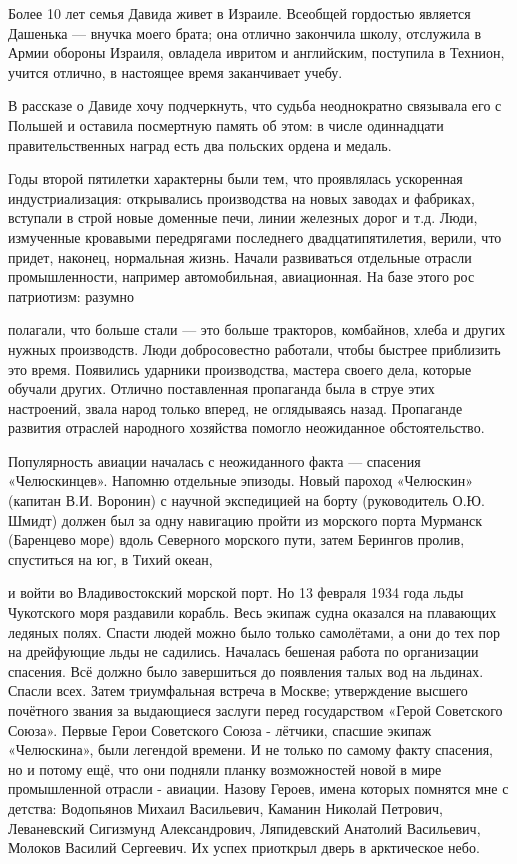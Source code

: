 \label{172-1}
Более 10 лет семья Давида живет в Израиле. Всеобщей гордостью является Дашенька — внучка моего брата; она отлично закончила школу, отслужила в Армии обороны Израиля, овладела ивритом и английским, поступила в Технион, учится отлично, в настоящее время заканчивает учебу. 

В рассказе о Давиде хочу подчеркнуть, что судьба неоднократно связывала его с Польшей и оставила посмертную память об этом: в числе одиннадцати правительственных наград есть два польских ордена и медаль. 

Годы второй пятилетки характерны были тем, что проявлялась ускоренная индустриализация: открывались производства на новых заводах и фабриках, вступали в строй новые доменные печи, линии железных дорог и т.д. Люди, измученные кровавыми передрягами последнего двадцатипятилетия, верили, что придет, наконец, нормальная жизнь. Начали развиваться отдельные отрасли промышленности, например автомобильная, авиационная. На базе этого рос патриотизм: разумно 

\label{173-1}
полагали, что больше стали — это больше тракторов, комбайнов, хлеба и других нужных производств. Люди добросовестно работали, чтобы быстрее приблизить это время. Появились ударники производства, мастера своего дела, которые обучали других. Отлично поставленная пропаганда была в струе этих настроений, звала народ только вперед, не оглядываясь назад. Пропаганде развития отраслей народного хозяйства помогло неожиданное обстоятельство.

Популярность авиации началась с неожиданного факта — спасения «Челюскинцев». Напомню отдельные эпизоды. Новый пароход «Челюскин» (капитан В.И. Воронин) с научной экспедицией на борту (руководитель О.Ю. Шмидт) должен был за одну навигацию пройти из морского порта Мурманск (Баренцево море) вдоль Северного морского пути, затем Берингов пролив, спуститься на юг, в Тихий океан,

\label{174-1}
и войти во Владивостокский морской порт. Но 13 февраля 1934 года льды Чукотского моря раздавили корабль. Весь экипаж судна оказался на плавающих ледяных полях. Спасти людей можно было только самолётами, а они до тех пор на дрейфующие льды не садились. Началась бешеная работа по организации спасения. Всё должно было завершиться до появления талых вод на льдинах. Спасли всех. Затем триумфальная встреча в Москве; утверждение высшего почётного звания за выдающиеся заслуги перед государством «Герой Советского Союза». Первые Герои Советского Союза - лётчики, спасшие экипаж «Челюскина», были легендой времени. И не только по самому факту спасения, но и потому ещё, что они подняли планку возможностей новой в мире промышленной отрасли - авиации. Назову Героев, имена которых помнятся мне с детства: Водопьянов Михаил Васильевич, Каманин Николай Петрович, Леваневский Сигизмунд Александрович, Ляпидевский Анатолий Васильевич, Молоков Василий Сергеевич. Их успех приоткрыл дверь в арктическое небо. 

